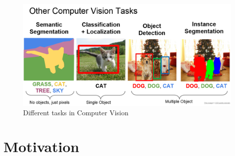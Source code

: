 \begin{figure}[H]
  \centering
  \includegraphics[scale=0.35]{images/Chapter1/computer_vision_tasks.png}
  \caption{Different tasks in Computer Vision \cite{cv_tasks}}
  \label{fig:computer_vision_tasks}
\end{figure}



% 
\section{Motivation}

